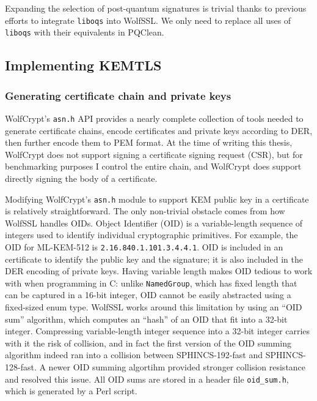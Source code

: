 \documentclass[letterpaper,12pt,titlepage,oneside,final]{book}
\begin{document}
Expanding the selection of post-quantum signatures is trivial thanks to previous efforts to integrate \texttt{liboqs} into WolfSSL. We only need to replace all uses of \texttt{liboqs} with their equivalents in PQClean.

\subsection{Implementing KEMTLS}\label{sec:implementing-kemtls}
\subsubsection{Generating certificate chain and private keys}
WolfCrypt's \texttt{asn.h} API provides a nearly complete collection of tools needed to generate certificate chains, encode certificates and private keys according to DER, then further encode them to PEM format. At the time of writing this thesis, WolfCrypt does not support signing a certificate signing request (CSR), but for benchmarking purposes I control the entire chain, and WolfCrypt does support directly signing the body of a certificate.

Modifying WolfCrypt's \texttt{asn.h} module to support KEM public key in a certificate is relatively straightforward. The only non-trivial obstacle comes from how WolfSSL handles OIDs. Object Identifier (OID) is a variable-length sequence of integers used to identify individual cryptographic primitives. For example, the OID for ML-KEM-512 is \texttt{2.16.840.1.101.3.4.4.1}. OID is included in an certificate to identify the public key and the signature; it is also included in the DER encoding of private keys. Having variable length makes OID tedious to work with when programming in C: unlike \texttt{NamedGroup}, which has fixed length that can be captured in a 16-bit integer, OID cannot be easily abstracted using a fixed-sized enum type. WolfSSL works around this limitation by using an ``OID sum'' algorithm, which computes an ``hash'' of an OID that fit into a 32-bit integer. Compressing variable-length integer sequence into a 32-bit integer carries with it the risk of collision, and in fact the first version of the OID summing algorithm indeed ran into a collision between SPHINCS-192-fast and SPHINCS-128-fast. A newer OID summing algortihm provided stronger collision resistance and resolved this issue. All OID sums are stored in a header file \texttt{oid\_sum.h}, which is generated by a Perl script.
\end{document}

